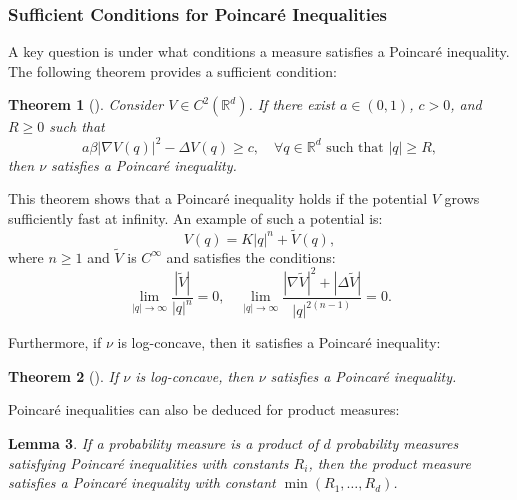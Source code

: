\documentclass[11pt, twoside]{report}
\newtheorem{theorem}{Theorem}[section]
\newtheorem{lemma}[theorem]{Lemma}
\begin{document}
\subsubsection{Sufficient Conditions for Poincar\'{e} Inequalities}

A key question is under what conditions a measure satisfies a Poincar\'e inequality. The following theorem provides a sufficient condition:

\begin{theorem}[\texorpdfstring{\cite[Corollary 1.6]{Bakry2008}}{}]
Consider $V \in C^2(\mathbb{R}^d)$. If there exist $a \in (0,1)$, $c>0$, and $R \geq 0$ such that
\begin{equation}
a\beta |\nabla V(q)|^2 - \Delta V(q) \geq c, \quad \forall q \in \mathbb{R}^d \text{ such that } |q| \geq R,
\end{equation}
then $\nu$ satisfies a Poincar\'e inequality.
\end{theorem}

This theorem shows that a Poincar\'e inequality holds if the potential $V$ grows sufficiently fast at infinity. An example of such a potential is:
\begin{equation}
V(q) = K|q|^n + \tilde{V}(q),
\end{equation}
where $n \geq 1$ and $\tilde{V}$ is $C^\infty$ and satisfies the conditions:
\begin{equation}
\lim_{|q| \to \infty} \frac{|\tilde{V}|}{|q|^n} = 0, \quad \lim_{|q| \to \infty} \frac{|\nabla \tilde{V}|^2 + |\Delta \tilde{V}|}{|q|^{2(n-1)}} = 0.
\end{equation}

Furthermore, if $\nu$ is log-concave, then it satisfies a Poincar\'e inequality:
\begin{theorem}[\texorpdfstring{\cite[Corollary 1.9]{Bakry2008}}{}]
If $\nu$ is log-concave, then $\nu$ satisfies a Poincar\'e inequality.
\end{theorem}
Poincar\'e inequalities can also be deduced for product measures:
\begin{lemma}
If a probability measure is a product of $d$ probability measures satisfying Poincar\'e inequalities with constants $R_i$, then the product measure satisfies a Poincar\'e inequality with constant $\min(R_1, \dots, R_d)$.
\end{lemma}\
\end{document}
